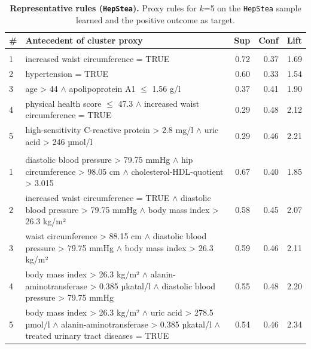 \documentclass[
  oneside]{book}
\begin{document}
\begin{table}

\caption{\label{tab:04-findings-hep-stea}\textbf{Representative rules (\texttt{HepStea}).} Proxy rules for \(k\)=5 on the \texttt{HepStea} sample learned and the positive outcome as target.}
\centering
\begin{tabular}[t]{l>{\raggedright\arraybackslash}p{10cm}rrr}
\toprule
\textbf{\#} & \textbf{Antecedent of cluster proxy} & \textbf{Sup} & \textbf{Conf} & \textbf{Lift}\\
\midrule
\addlinespace[0.3em]
\multicolumn{5}{l}{\textbf{HotSpot}}\\
\hspace{1em}1 & increased waist circumference = TRUE & 0.72 & 0.37 & 1.69\\
\hspace{1em}2 & hypertension = TRUE & 0.60 & 0.33 & 1.54\\
\hspace{1em}3 & age > 44 $\wedge$ apolipoprotein A1 $\leq$ 1.56 g/l & 0.37 & 0.41 & 1.90\\
\hspace{1em}4 & physical health score $\leq$ 47.3 $\wedge$ increased waist circumference = TRUE & 0.29 & 0.48 & 2.12\\
\hspace{1em}5 & high-sensitivity C-reactive protein > 2.8 mg/l $\wedge$ uric acid > 246 µmol/l & 0.29 & 0.46 & 2.21\\
\addlinespace[0.3em]
\multicolumn{5}{l}{\textbf{SD-Map}}\\
\hspace{1em}1 & diastolic blood pressure > 79.75 mmHg $\wedge$ hip circumference > 98.05 cm $\wedge$ cholesterol-HDL-quotient > 3.015 & 0.67 & 0.40 & 1.85\\
\hspace{1em}2 & increased waist circumference = TRUE $\wedge$ diastolic blood pressure > 79.75 mmHg $\wedge$ body mass index > 26.3 kg/m² & 0.58 & 0.45 & 2.07\\
\hspace{1em}3 & waist circumference > 88.15 cm $\wedge$ diastolic blood pressure > 79.75 mmHg $\wedge$ body mass index > 26.3 kg/m² & 0.59 & 0.46 & 2.11\\
\hspace{1em}4 & body mass index > 26.3 kg/m² $\wedge$ alanin-aminotransferase > 0.385 µkatal/l $\wedge$ diastolic blood pressure > 79.75 mmHg & 0.55 & 0.48 & 2.20\\
\hspace{1em}5 & body mass index > 26.3 kg/m² $\wedge$ uric acid > 278.5 µmol/l $\wedge$ alanin-aminotransferase > 0.385 µkatal/l $\wedge$ treated urinary tract diseases = TRUE & 0.54 & 0.46 & 2.34\\
\bottomrule
\end{tabular}
\end{table}
\end{document}
